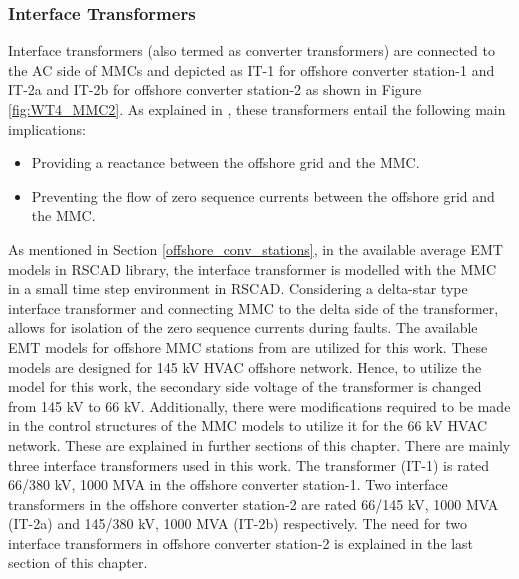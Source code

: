 \subsubsection{Interface Transformers}
Interface transformers (also termed as converter transformers) are connected to the \gls{AC} side of \gls{MMC}s and depicted as IT-1 for offshore converter station-1 and IT-2a and IT-2b for offshore converter station-2 as shown in Figure \ref{fig:WT4_MMC2}. As explained in \cite{cigre2005b4}, these transformers entail the following main implications:
\begin{itemize}
    \item Providing a reactance between the offshore grid and the \gls{MMC}.
    \item Preventing the flow of zero sequence currents between the offshore grid and the \gls{MMC}.
\end{itemize} 

As mentioned in Section \ref{offshore_conv_stations}, in the available average \gls{EMT} models in RSCAD library, the interface transformer is modelled with the \gls{MMC} in a small time step environment in RSCAD. Considering a delta-star type interface transformer and connecting \gls{MMC} to the delta side of the transformer, allows for isolation of the zero sequence currents during faults. The available \gls{EMT} models for offshore \gls{MMC} stations from \cite{vrana2013cigre} are utilized for this work. These models are designed for 145 kV \gls{HVAC} offshore network. Hence, to utilize the model for this work, the secondary side voltage of the transformer is changed from 145 kV to 66 kV. Additionally, there were modifications required to be made in the control structures of the \gls{MMC} models to utilize it for the 66 kV \gls{HVAC} network. These are explained in further sections of this chapter. There are mainly three interface transformers used in this work. The transformer (IT-1) is rated 66/380 kV, 1000 MVA in the offshore converter station-1. Two interface transformers in the offshore converter station-2 are rated 66/145 kV, 1000 MVA (IT-2a) and 145/380 kV, 1000 MVA (IT-2b) respectively. The need for two interface transformers in offshore converter station-2 is explained in the last section of this chapter.


